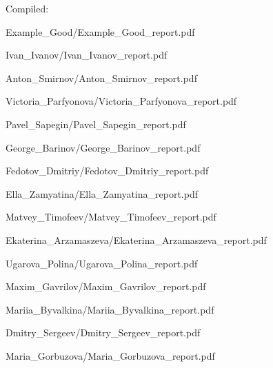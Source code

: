 \documentclass[a4paper]{article}
\begin{document}
Compiled: \DTMnow
\tableofcontents

\clearpage

{Example_Good/Example_Good_report.pdf}

{Ivan_Ivanov/Ivan_Ivanov_report.pdf}

{Anton_Smirnov/Anton_Smirnov_report.pdf}

{Victoria_Parfyonova/Victoria_Parfyonova_report.pdf}

{Pavel_Sapegin/Pavel_Sapegin_report.pdf}

{George_Barinov/George_Barinov_report.pdf}

{Fedotov_Dmitriy/Fedotov_Dmitriy_report.pdf}

{Ella_Zamyatina/Ella_Zamyatina_report.pdf}

{Matvey_Timofeev/Matvey_Timofeev_report.pdf}

{Ekaterina_Arzamaszeva/Ekaterina_Arzamaszeva_report.pdf}

{Ugarova_Polina/Ugarova_Polina_report.pdf}

{Maxim_Gavrilov/Maxim_Gavrilov_report.pdf}

{Mariia_Byvalkina/Mariia_Byvalkina_report.pdf}

{Dmitry_Sergeev/Dmitry_Sergeev_report.pdf}

{Maria_Gorbuzova/Maria_Gorbuzova_report.pdf}
\end{document}
